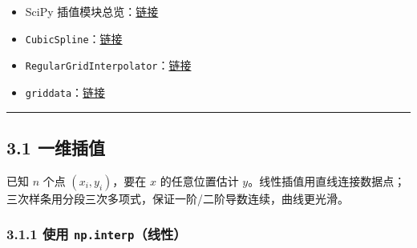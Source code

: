 \begin{itemize}
\tightlist
\item
  SciPy
  插值模块总览：\href{https://docs.scipy.org/doc/scipy/reference/interpolate.html}{链接}
\item
  \texttt{CubicSpline}：\href{https://docs.scipy.org/doc/scipy/reference/generated/scipy.interpolate.CubicSpline.html}{链接}
\item
  \texttt{RegularGridInterpolator}：\href{https://docs.scipy.org/doc/scipy/reference/generated/scipy.interpolate.RegularGridInterpolator.html}{链接}
\item
  \texttt{griddata}：\href{https://docs.scipy.org/doc/scipy/reference/generated/scipy.interpolate.griddata.html}{链接}
\end{itemize}

\begin{center}\rule{0.5\linewidth}{0.5pt}\end{center}

\subsection{3.1 一维插值}\label{ux4e00ux7ef4ux63d2ux503c}

已知 \(n\) 个点 \((x_i,y_i)\)，要在 \(x\) 的任意位置估计
\(y\)。线性插值用直线连接数据点；三次样条用分段三次多项式，保证一阶/二阶导数连续，曲线更光滑。

\subsubsection{\texorpdfstring{3.1.1 使用
\texttt{np.interp}（线性）}{3.1.1 使用 np.interp（线性）}}\label{ux4f7fux7528-np.interpux7ebfux6027}

\begin{Shaded}
\begin{Highlighting}[]
\OperatorTok{=}\OperatorTok{=}\NormalTok{)}
\OperatorTok{=}\NormalTok{ np.array([}\NormalTok{, }\NormalTok{, }\NormalTok{, }\NormalTok{, }\NormalTok{, }\NormalTok{])}
\OperatorTok{=}\NormalTok{ np.array([}\NormalTok{, }\NormalTok{, }\NormalTok{, }\NormalTok{, }\OperatorTok{{-}}\NormalTok{, }\OperatorTok{{-}}\NormalTok{])}
\NormalTok{(np.interp([}\NormalTok{, }\NormalTok{, }\NormalTok{], x, y))}
\end{Highlighting}
\end{Shaded}


